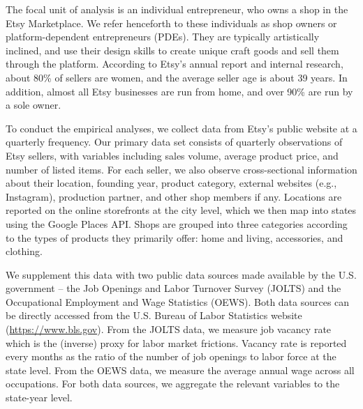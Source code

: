 \documentclass[letterpaper,12pt]{article}
\begin{document}
The focal unit of analysis is an individual entrepreneur, who owns a shop in the Etsy Marketplace. We refer henceforth to these individuals as shop owners or platform-dependent entrepreneurs (PDEs). They are typically artistically inclined, and use their design skills to create unique craft goods and sell them through the platform. According to Etsy's annual report and internal research, about 80\% of sellers are women, and the average seller age is about 39 years. In addition, almost all Etsy businesses are run from home, and over 90\% are run by a sole owner.



To conduct the empirical analyses, we collect data from Etsy's public website at a quarterly frequency. Our primary data set consists of quarterly observations of Etsy sellers, with variables including sales volume, average product price, and number of listed items. For each seller, we also observe cross-sectional information about their location, founding year, product category, external websites (e.g., Instagram), production partner, and other shop members if any. Locations are reported on the online storefronts at the city level, which we then map into states using the Google Places API. Shops are grouped into three categories according to the types of products they primarily offer: home and living, accessories, and clothing.


We supplement this data with two public data sources made available by the U.S. government -- the Job Openings and Labor Turnover Survey (JOLTS) and the Occupational Employment and Wage Statistics (OEWS). Both data sources can be directly accessed from the U.S. Bureau of Labor Statistics website (\url{https://www.bls.gov}). From the JOLTS data, we measure job vacancy rate which is the (inverse) proxy for labor market frictions. Vacancy rate is reported every months as the ratio of the number of job openings to labor force at the state level. From the OEWS data, we measure the average annual wage across all occupations. For both data sources, we aggregate the relevant variables to the state-year level.


\end{document}
